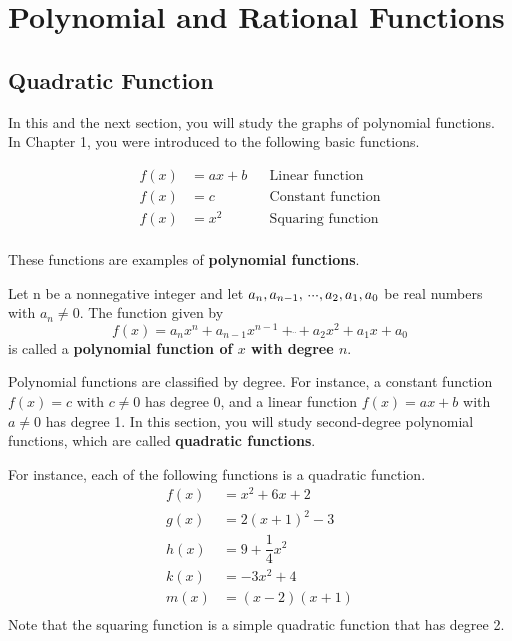 \chapter{Polynomial and Rational Functions}
\section{Quadratic Function}

In this and the next section, you will study the graphs of polynomial functions. In Chapter 1, you were introduced to the following basic functions. \cite{ci}

\begin{align*}
    f(x)&=ax+b       && \text{Linear function}\\
    f(x)&=c          && \text{Constant function}\\
    f(x)&=x^2        && \text{Squaring function}\\
\end{align*}

These functions are examples of \textbf{polynomial functions}.

\begin{definition}
    Let n be a nonnegative integer and let $a_n, a_{n-1}, \dddot{} , a_2, \\a_1, a_0$ be real numbers with $a_n \neq 0$. The function given by
    $$f(x)=a_nx^n+a_{n-1}x^{n-1}+\dddot{}+a_2x^2+a_1x+a_0$$
    is called a \textbf{polynomial function of $x$ with degree $n$}.
    \\ \cite{ci}
\end{definition}

Polynomial functions are classified by degree. For instance, a constant function $f(x)=c$ with $c\neq 0$ has degree 0, and a linear function $f(x)=ax+b$ with $a\neq 0$ has degree 1. In this section, you will study second-degree polynomial functions, which are called \textbf{quadratic functions}. \cite{ci}

For instance, each of the following functions is a quadratic function.
\begin{align*}
    f(x)&=x^2+6x+2\\
    g(x)&=2(x+1)^2-3\\
    h(x)&=9+\dfrac{1}{4}x^2\\
    k(x)&=-3x^2+4\\
    m(x)&=(x-2)(x+1)\\
\end{align*}
Note that the squaring function is a simple quadratic function that has degree 2.

